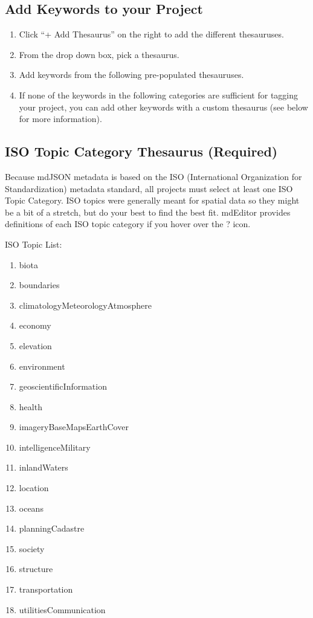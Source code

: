 \documentclass[
]{book}
\providecommand{\tightlist}{%
  \setlength{\itemsep}{0pt}\setlength{\parskip}{0pt}}
\begin{document}
\hypertarget{add-keywords-to-your-project}{%
\subsection{Add Keywords to your Project}\label{add-keywords-to-your-project}}

\begin{enumerate}
\def\labelenumi{\arabic{enumi}.}
\tightlist
\item
  Click ``+ Add Thesaurus'' on the right to add the different thesauruses.
\item
  From the drop down box, pick a thesaurus.
\item
  Add keywords from the following pre-populated thesauruses.
\item
  If none of the keywords in the following categories are sufficient for tagging your project, you can add other keywords with a custom thesaurus (see below for more information).
\end{enumerate}

\hypertarget{iso-topic-category-thesaurus-required}{%
\subsection{ISO Topic Category Thesaurus (Required)}\label{iso-topic-category-thesaurus-required}}

Because mdJSON metadata is based on the ISO (International Organization for Standardization) metadata standard, all projects must select at least one ISO Topic Category. ISO topics were generally meant for spatial data so they might be a bit of a stretch, but do your best to find the best fit. mdEditor provides definitions of each ISO topic category if you hover over the ? icon.

ISO Topic List:

\begin{enumerate}
\def\labelenumi{\arabic{enumi}.}
\tightlist
\item
  biota
\item
  boundaries
\item
  climatologyMeteorologyAtmosphere
\item
  economy
\item
  elevation
\item
  environment
\item
  geoscientificInformation
\item
  health
\item
  imageryBaseMapsEarthCover
\item
  intelligenceMilitary
\item
  inlandWaters
\item
  location
\item
  oceans
\item
  planningCadastre
\item
  society
\item
  structure
\item
  transportation
\item
  utilitiesCommunication
\end{enumerate}
\end{document}
